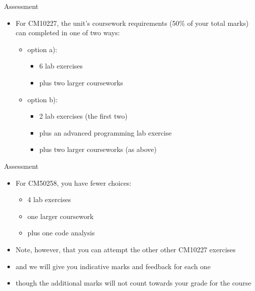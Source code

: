 \documentclass{beamer}
\begin{document}
\begin{frame}
Assessment

\begin{itemize}
\item For CM10227, the unit's coursework requirements (50\% of your total marks) can completed in one of two ways:

\begin{itemize}
\item option a):
\begin{itemize}
\item 6 lab exercises
\item plus two larger courseworks
\end{itemize}
\item option b):
\begin{itemize}
\item 2 lab exercises (the first two)
\item plus an advanced programming lab exercise
\item plus two larger courseworks (as above)
\end{itemize}
\end{itemize}
\end{itemize}
\end{frame} 

\begin{frame}
Assessment

\begin{itemize}
\item For CM50258, you have fewer choices:

\begin{itemize}
\item 4 lab exercises
\item one larger coursework
\item plus one code analysis
\end{itemize}
\item Note, however, that you can attempt the other other CM10227 exercises
\item and we will give you indicative marks and feedback for each one
\item though the additional marks will not count towards your grade for the course
\end{itemize}
\end{frame} 
\end{document}
